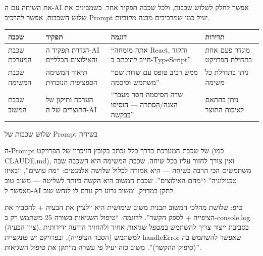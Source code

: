 


את השיחה עם ה-AI אפשר לחלק לשלוש שכבות, ולכל שכבה תפקיד אחר. כשמבינים את שלוש השכבות, אפשר להרכיב Prompt יעיל כמו שמרכיבים מבנה מקוביות.

\begin{center}
\begin{tabularx}{\linewidth}{|X|X|X|X|}
\hline
\textbf{שכבה} & \textbf{תפקיד} & \textbf{דוגמה} & \textbf{תדירות} \tabularnewline
\hline
שכבת המערכת & הגדרת תפקיד ה-AI והאילוצים הכלליים & “אתה מומחה React, והקוד חייב להיכתב ב-TypeScript” & מוגדר פעם אחת בתחילת הפרויקט \tabularnewline
שכבת המשימה & תיאור המשימה הספציפית הנוכחית & “ממש רכיב טופס עם שדות שם משתמש וסיסמה” & ניתן בתחילת כל משימה \tabularnewline
שכבת המשוב & הערכה ותיקון של התוצרים של ה-AI & “שדה הסיסמה חסר מעבר הצגה/הסתרה — הוסיפו בבקשה” & ניתן בהתאם לאיכות התוצר \tabularnewline
\hline
\end{tabularx}
\end{center}

\begin{center}\small\color{gray}שלוש שכבות של Prompt בשיחה\end{center}

ה-Prompt של שכבת המערכת בדרך כלל נכתב בקובץ הזיכרון של הפרויקט (כמו CLAUDE.md), ואין צורך לחזור עליו בכל שיחה. שכבת המשימה היא השכבה שבה משתמשים הכי הרבה בשיחה — היא אמורה לכלול שלושה אלמנטים: “מה עושים”, “באיזו טכנולוגיה” ו“מהם האילוצים”. שכבת המשוב היא הקשה ביותר לשליטה — משוב טוב מאפשר ל-AI לתקן במדויק, ומשוב גרוע רק גורם לו לנחש שוב.

\begin{tcbinfo}{טיפ: שלושת מהלכי המשוב}
תבנית משוב שימושית היא “לציין את הבעיה + להסביר את הציפייה + לספק הקשר”. לדוגמה: “טיפול השגיאות בשורה 25 משתמש רק ב-console.log (ציון הבעיה), בסביבת ייצור צריך להשתמש במטפל שגיאות אחיד ולהחזיר הודעה ידידותית למשתמש (הסבר הציפייה), ובפרויקט יש פונקציית handleError שאפשר להשתמש בה (סיפוק ההקשר)”. משוב כזה יעיל פי עשרה מ“תקן את טיפול השגיאות”.

\end{tcbinfo}

